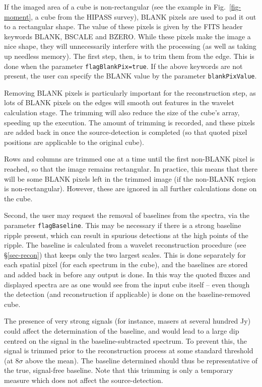 
If the imaged area of a cube is non-rectangular (see the example in
Fig.~\ref{fig-moment}, a cube from the HIPASS survey), BLANK pixels are
used to pad it out to a rectangular shape. The value of these pixels
is given by the FITS header keywords BLANK, BSCALE and BZERO. While
these pixels make the image a nice shape, they will unnecessarily
interfere with the processing (as well as taking up needless
memory). The first step, then, is to trim them from the edge. This is
done when the parameter \texttt{flagBlankPix=true}. If the above
keywords are not present, the user can specify the BLANK value by the
parameter \texttt{blankPixValue}.

Removing BLANK pixels is particularly important for the reconstruction
step, as lots of BLANK pixels on the edges will smooth out features in
the wavelet calculation stage. The trimming will also reduce the size
of the cube's array, speeding up the execution. The amount of trimming
is recorded, and these pixels are added back in once the
source-detection is completed (so that quoted pixel positions are
applicable to the original cube).

Rows and columns are trimmed one at a time until the first non-BLANK
pixel is reached, so that the image remains rectangular. In practice,
this means that there will be some BLANK pixels left in the trimmed
image (if the non-BLANK region is non-rectangular). However, these are
ignored in all further calculations done on the cube.


Second, the user may request the removal of baselines from the
spectra, via the parameter \texttt{flagBaseline}. This may be
necessary if there is a strong baseline ripple present, which can
result in spurious detections at the high points of the ripple. The
baseline is calculated from a wavelet reconstruction procedure (see
\S\ref{sec-recon}) that keeps only the two largest scales. This is
done separately for each spatial pixel (\ie for each spectrum in the
cube), and the baselines are stored and added back in before any
output is done. In this way the quoted fluxes and displayed spectra
are as one would see from the input cube itself -- even though the
detection (and reconstruction if applicable) is done on the
baseline-removed cube.

The presence of very strong signals (for instance, masers at several
hundred Jy) could affect the determination of the baseline, and would
lead to a large dip centred on the signal in the baseline-subtracted
spectrum. To prevent this, the signal is trimmed prior to the
reconstruction process at some standard threshold (at $8\sigma$ above
the mean). The baseline determined should thus be representative of
the true, signal-free baseline. Note that this trimming is only a
temporary measure which does not affect the source-detection.

